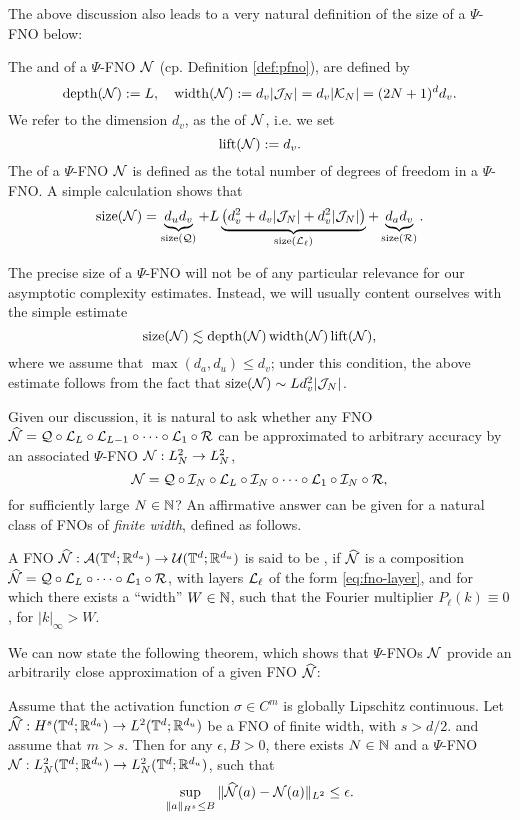 \documentclass[reqno,a4paper]{amsart}
\begin{document}
The above discussion also leads to a very natural definition of the size of a $\Psi$-FNO below:
\begin{definition}
The  and  of a $\Psi$-FNO $\mathcal{N}$ (cp. Definition \ref{def:pfno}), are defined by
\[
\mathrm{depth}(\mathcal{N}) := L, 
\quad
\mathrm{width}(\mathcal{N}) := d_v |\mathcal{J}_N| = d_v |\mathcal{K}_N| = (2N+1)^d d_v.
\]
We refer to the dimension $d_v$, as the  of $\mathcal{N}$, i.e. we set 
\[
\mathrm{lift}(\mathcal{N}) := d_v.
\]
The  of a $\Psi$-FNO $\mathcal{N}$ is defined as the total number of degrees of freedom in a $\Psi$-FNO. A simple calculation shows that 
\[
\mathrm{size}(\mathcal{N})
=
\underbrace{d_u d_v}_{\mathrm{size}(\mathcal{Q})} 
+
L\underbrace{ \left(d_v^2 + d_v |\mathcal{J}_N| + d_v^2 |\mathcal{J}_N| \right)}_{\mathrm{size}(\mathcal{L}_\ell)}
+
\underbrace{d_a d_v}_{\mathrm{size}(\mathcal{R})}.
\]
\end{definition}
The precise size of a $\Psi$-FNO will not be of any particular relevance for our asymptotic complexity estimates. Instead, we will usually content ourselves with the simple estimate
\[
\mathrm{size}(\mathcal{N})
\lesssim
\mathrm{depth}(\mathcal{N}) \, \mathrm{width}(\mathcal{N})\, \mathrm{lift}(\mathcal{N}),
\]
where we assume that $\max(d_a,d_u) \le d_v$; under this condition, the above estimate follows from the fact that $\mathrm{size}(\mathcal{N})\sim L d_v^2 |\mathcal{J}_N|$.

Given our discussion, it is natural to ask whether any FNO $\widehat{\mathcal{N}} = \mathcal{Q} \circ \mathcal{L}_{L} \circ \mathcal{L}_{L-1} \circ \dots \circ \mathcal{L}_{1} \circ \mathcal{R}$ can be approximated to arbitrary accuracy by an associated $\Psi$-FNO $\mathcal{N}: L^2_N \to L^2_N$, 
\[
\mathcal{N} 
=
\mathcal{Q} \circ \mathcal{I}_N \circ \mathcal{L}_L \circ \mathcal{I}_N  \circ \dots \circ \mathcal{L}_1 \circ \mathcal{I}_N \circ \mathcal{R},
\] 
for sufficiently large $N \in \mathbb{N}$? An affirmative answer can be given for a natural class of FNOs of \emph{finite width}, defined as follows.

\begin{definition}
A FNO $\widehat{\mathcal{N}}: \mathcal{A}(\mathbb{T}^d;\mathbb{R}^{d_a}) \to \mathcal{U}(\mathbb{T}^d;\mathbb{R}^{d_u})$ is said to be , if $\widehat{\mathcal{N}}$ is a composition $\widehat{\mathcal{N}} = \mathcal{Q} \circ \mathcal{L}_{L} \circ \dots \circ \mathcal{L}_{1} \circ \mathcal{R}$, with layers $\mathcal{L}_{\ell}$ of the form \eqref{eq:fno-layer}, and for which there exists a ``width'' $W\in \mathbb{N}$, such that the Fourier multiplier $P_\ell(k) \equiv 0$, for $|k|_\infty > W$. 
\end{definition}

We can now state the following theorem, which shows that $\Psi$-FNOs $\mathcal{N}$ provide an arbitrarily close approximation of a given FNO $\widehat{\mathcal{N}}$:

\begin{theorem} \label{thm:fno-pfno}
Assume that the activation function $\sigma \in C^{m}$ is globally Lipschitz continuous. 
Let $\widehat{\mathcal{N}}: H^s(\mathbb{T}^d;\mathbb{R}^{d_a}) \to L^2(\mathbb{T}^d;\mathbb{R}^{d_u})$ be a FNO of finite width, with $s>d/2$. and assume that $m>s$. Then for any $\epsilon, B > 0$, there exists $N\in \mathbb{N}$ and a $\Psi$-FNO $\mathcal{N}: L^2_N(\mathbb{T}^d;\mathbb{R}^{d_a}) \to L^2_N(\mathbb{T}^d;\mathbb{R}^{d_u})$, such that 
\[
\sup_{\Vert a \Vert_{H^s} \le B}
\Vert 
\widehat{\mathcal{N}}(a) - \mathcal{N}(a) 
\Vert_{L^2} \le \epsilon.
\]
\end{theorem}
\end{document}
